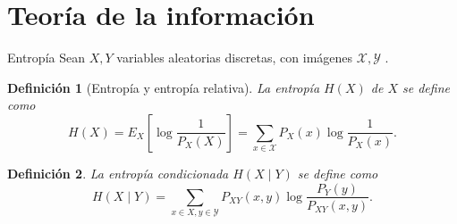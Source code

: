 \documentclass[aspectratio=169]{beamer}
\newcommand{\X}{\mathcal{X}}
\newtheorem{defi}{Definición}
\begin{document}
  
  \section{Teoría de la información}

  \begin{frame}{Entropía}
    Sean \(X,Y\) variables aleatorias discretas, con imágenes \(\X, \mathcal Y\) .


    \begin{defi}[Entropía y entropía relativa]
    
    
      La entropía \(H(X)\) de \(X\) se define como
      \[
        H(X) = E_X\left[\log\frac{1}{P_X(X)}\right] =  \sum_{x \in \X} P_X(x) \log\frac{1}{P_X(x)}.
      \]
    \end{defi}
    \begin{defi}
      La entropía  condicionada \(H(X\mid Y)\) se define como
      \[
        H(X\mid Y) = \sum_{x \in X,y \in \mathcal Y}P_{XY}(x,y)\log\frac{P_Y(y)}{P_{XY}(x,y)}.
      \]
      
      
    \end{defi}

  \end{frame}
\end{document}
